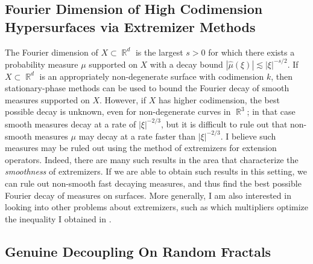 \documentclass[11pt]{article}
\theoremstyle{definition}
\DeclareMathOperator{\RR}{\mathbb{R}}
\begin{document}
\subsection*{Fourier Dimension of High Codimension Hypersurfaces via Extremizer Methods}

The Fourier dimension of $X \subset \RR^d$ is the largest $s > 0$ for which there exists a probability measure $\mu$ supported on $X$ with a decay bound $|\widehat{\mu}(\xi)| \lesssim |\xi|^{-s/2}$. If $X \subset \RR^d$ is an appropriately non-degenerate surface with codimension $k$, then stationary-phase methods can be used to bound the Fourier decay of smooth measures supported on $X$. However, if $X$ has higher codimension, the best possible decay is unknown, even for non-degenerate curves in $\RR^3$; in that case smooth measures decay at a rate of $|\xi|^{-2/3}$, but it is difficult to rule out that non-smooth measures $\mu$ may decay at a rate faster than $|\xi|^{-2/3}$. I believe such measures may be ruled out using the method of extremizers for extension operators. Indeed, there are many such results in the area that characterize the \emph{smoothness} of extremizers. If we are able to obtain such results in this setting, we can rule out non-smooth fast decaying measures, and thus find the best possible Fourier decay of measures on surfaces. More generally, I am also interested in looking into other problems about extremizers, such as which multipliers optimize the inequality I obtained in \cite{DensonCharacterization}.

\subsection*{Genuine Decoupling On Random Fractals}
\end{document}
